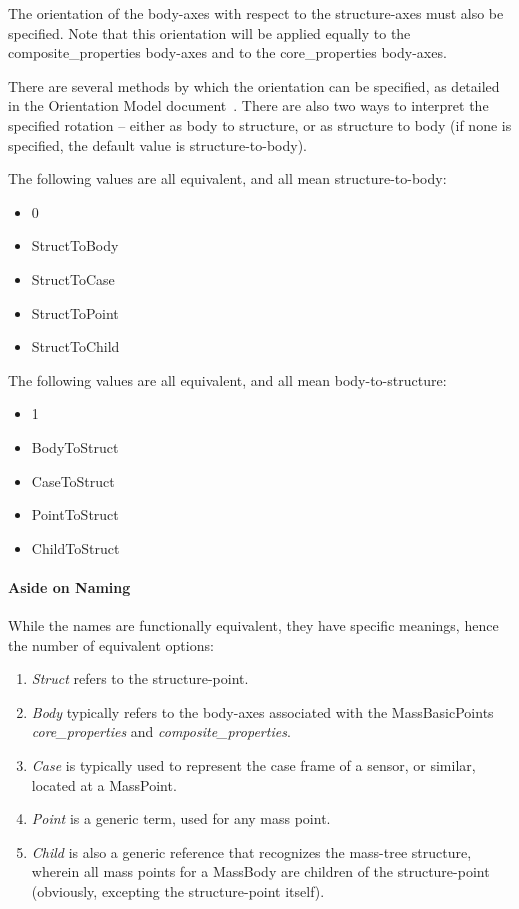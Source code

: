 The orientation of the body-axes with respect to the structure-axes must also
be specified.  Note that this orientation will be applied equally to the
composite\_properties body-axes and to the core\_properties body-axes.

There are several methods by which the orientation can be specified, as
detailed in the Orientation Model document~\cite{dynenv:ORIENTATION}.  There
are also two ways to interpret the specified rotation -- either as body to
structure, or as structure to body (if none is specified, the default value is
structure-to-body).

The following values are all equivalent, and all mean structure-to-body:
\begin{itemize}
 \item 0
 \item StructToBody
 \item StructToCase
 \item StructToPoint
 \item StructToChild
\end{itemize}

The following values are all equivalent, and all mean body-to-structure:
\begin{itemize}
 \item 1
 \item BodyToStruct
 \item CaseToStruct
 \item PointToStruct
 \item ChildToStruct
\end{itemize}

\paragraph{Aside on Naming}
While the names are functionally equivalent, they have specific meanings,
hence the number of equivalent options:
\begin{enumerate}
\item \textit{Struct} refers to the structure-point.
\item \textit{Body} typically refers to the body-axes associated with the
MassBasicPoints \textit{core\_properties} and \textit{composite\_properties}.
\item \textit{Case} is typically used to represent the case frame of a sensor,
or similar, located at a MassPoint.
\item \textit{Point} is a generic term, used for any mass point.
\item \textit{Child} is also a generic reference that recognizes the mass-tree
structure, wherein all mass points for a MassBody are children of the
structure-point (obviously, excepting the structure-point itself).
\end{enumerate}


